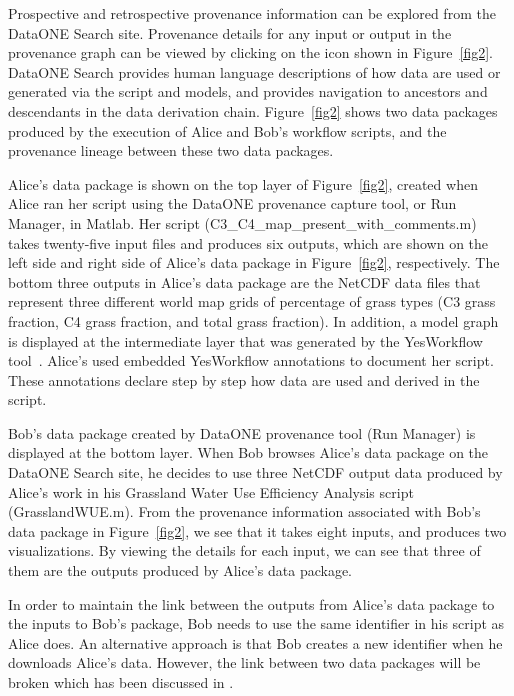 \documentclass[a4paper]{llncs}
\begin{document}
Prospective and retrospective provenance information can be explored from the DataONE Search site. Provenance details for any input or output in the provenance graph can be viewed by clicking on the icon shown in Figure~\ref{fig2}. DataONE Search provides human language descriptions of how data are used or generated via the script and models, and provides navigation to ancestors and descendants in the data derivation chain. Figure~\ref{fig2} shows two data packages produced by the execution of Alice and Bob's workflow scripts, and the provenance lineage between these two data packages. 

Alice's data package \cite{yaxing} is shown on the top layer of Figure~\ref{fig2}, created when Alice ran her script using the DataONE provenance capture tool, or Run Manager, in Matlab. Her script (C3\_C4\_map\_present\_with\_comments.m) takes twenty-five input files and produces six outputs, which are shown on the left side and right side of Alice's data package in Figure~\ref{fig2}, respectively. The bottom three outputs in Alice's data package are the NetCDF data files that represent three different world map grids of percentage of grass types (C3 grass fraction, C4 grass fraction, and total grass fraction). In addition, a model graph is displayed at the intermediate layer that was generated by the YesWorkflow tool~\cite{yesworkflow}. Alice's used embedded YesWorkflow annotations to document her script. These annotations declare step by step how data are used and derived in the script. 


Bob's data package \cite{christopher} created by DataONE provenance tool (Run Manager) is displayed at the bottom layer. When Bob browses Alice's data package on the DataONE Search site, he decides to use three NetCDF output data produced by Alice's work in his Grassland Water Use Efficiency Analysis script (GrasslandWUE.m). From the provenance information associated with Bob's data package in Figure~\ref{fig2}, we see that it takes eight inputs, and produces two visualizations. By viewing the details for each input, we can see that three of them are the outputs produced by Alice's data package.  

In order to maintain the link between the outputs from Alice's data package to the inputs to Bob's package, Bob needs to use the same identifier in his script as Alice does. An alternative approach is that Bob creates a new identifier when he downloads Alice's data. However, the link between two data packages will be broken which has been discussed in \cite{missing-link}.  
\end{document}
